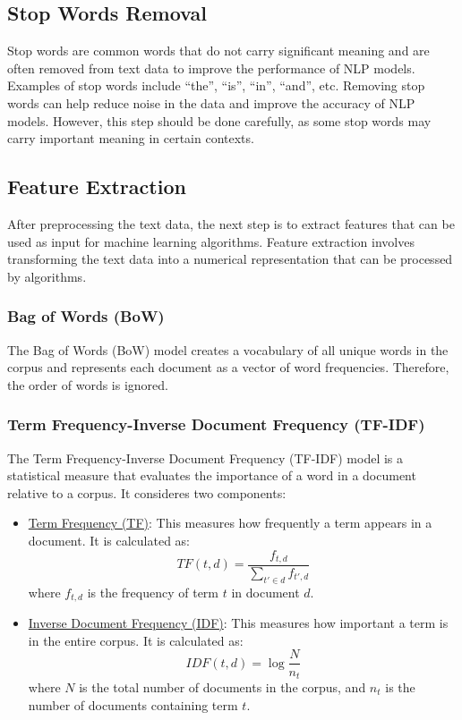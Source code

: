 \subsection{Stop Words Removal}

Stop words are common words that do not carry significant meaning and are often removed from text data to improve the performance of NLP models. Examples of stop words include ``the'', ``is'', ``in'', ``and'', etc. Removing stop words can help reduce noise in the data and improve the accuracy of NLP models. However, this step should be done carefully, as some stop words may carry important meaning in certain contexts.

\subsection{Feature Extraction}

After preprocessing the text data, the next step is to extract features that can be used as input for machine learning algorithms. Feature extraction involves transforming the text data into a numerical representation that can be processed by algorithms.

\subsubsection{Bag of Words (BoW)}

The Bag of Words (BoW) model creates a vocabulary of all unique words in the corpus and represents each document as a vector of word frequencies. Therefore, the order of words is ignored.

\subsubsection{Term Frequency-Inverse Document Frequency (TF-IDF)}

The Term Frequency-Inverse Document Frequency (TF-IDF) model is a statistical measure that evaluates the importance of a word in a document relative to a corpus. It consideres two components:
\begin{itemize}
    \item \ul{Term Frequency (TF)}: This measures how frequently a term appears in a document. It is calculated as:
    \begin{equation}
        TF(t,d) = \frac{f_{t,d}}{\sum\limits_{t' \in d} f_{t',d}}
    \end{equation}
    where $f_{t,d}$ is the frequency of term $t$ in document $d$.
    \item \ul{Inverse Document Frequency (IDF)}: This measures how important a term is in the entire corpus. It is calculated as:
    \begin{equation}
        IDF(t,d) = \log\frac{N}{n_t}
    \end{equation}
    where $N$ is the total number of documents in the corpus, and $n_t$ is the number of documents containing term $t$.
\end{itemize}

